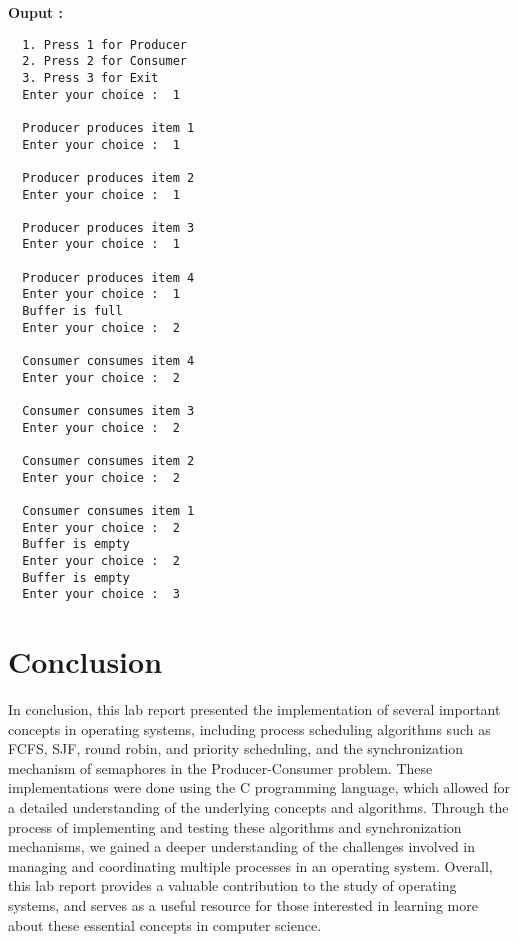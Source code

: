 \documentclass[journal,onecolumn]{IEEEtran}
\begin{document}
\textbf{Ouput :}
\begin{verbatim}
  1. Press 1 for Producer
  2. Press 2 for Consumer
  3. Press 3 for Exit
  Enter your choice :  1
  
  Producer produces item 1
  Enter your choice :  1
  
  Producer produces item 2
  Enter your choice :  1
  
  Producer produces item 3
  Enter your choice :  1
  
  Producer produces item 4
  Enter your choice :  1
  Buffer is full
  Enter your choice :  2
  
  Consumer consumes item 4
  Enter your choice :  2
  
  Consumer consumes item 3
  Enter your choice :  2
  
  Consumer consumes item 2
  Enter your choice :  2
  
  Consumer consumes item 1
  Enter your choice :  2
  Buffer is empty
  Enter your choice :  2
  Buffer is empty
  Enter your choice :  3
\end{verbatim}


\section{Conclusion}
In conclusion, this lab report presented the implementation of several important concepts in operating systems, including process scheduling algorithms such as FCFS, SJF, round robin, and priority scheduling, and the synchronization mechanism of semaphores in the Producer-Consumer problem. These implementations were done using the C programming language, which allowed for a detailed understanding of the underlying concepts and algorithms. Through the process of implementing and testing these algorithms and synchronization mechanisms, we gained a deeper understanding of the challenges involved in managing and coordinating multiple processes in an operating system. Overall, this lab report provides a valuable contribution to the study of operating systems, and serves as a useful resource for those interested in learning more about these essential concepts in computer science.
\end{document}
